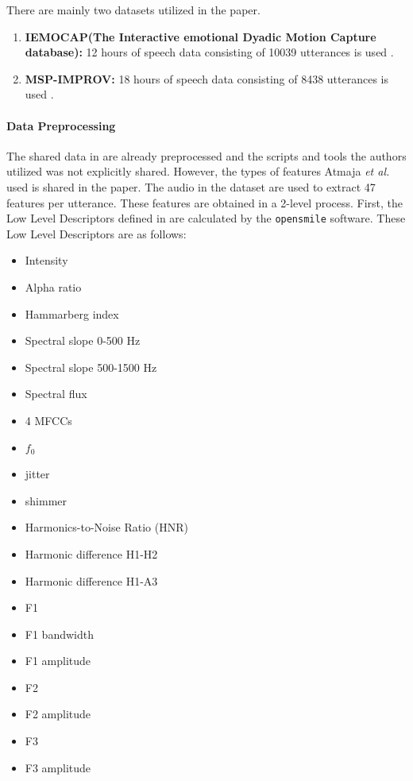 \documentclass[a4paper,11pt]{article}
\begin{document}
There are mainly two datasets utilized in the paper. 
\begin{enumerate}
    \item \textbf{IEMOCAP(The Interactive emotional Dyadic Motion Capture database):} 12 hours of speech data consisting of 10039 utterances  is used \cite{busso2008iemocap}.
    \item \textbf{MSP-IMPROV:} 18 hours of speech data consisting of 8438 utterances is used \cite{busso2016msp}.
\end{enumerate}

\paragraph{Data Preprocessing} \label{subsec:datapreprocess}

The shared data in \cite{atmaja2020deep} are already preprocessed and the scripts and tools the authors utilized was not explicitly shared. However, the types of features Atmaja \textit{et al.} used is shared in the paper.  
The audio in the dataset are used to extract 47 features per utterance.
These features are obtained in a 2-level process. First, the Low Level Descriptors defined in \cite{eyben2010opensmile} are calculated by the \texttt{opensmile} software. These Low Level Descriptors are as follows: 
\begin{multicols}{3}
\begin{itemize}
    \item Intensity
    \item Alpha ratio
    \item Hammarberg index
    \item Spectral slope 0-500 Hz
    \item Spectral slope 500-1500 Hz
    \item Spectral flux
    \item 4 MFCCs
    \item $f_0$
    \item jitter
    \item shimmer
    \item Harmonics-to-Noise Ratio (HNR)
    \item Harmonic difference H1-H2
    \item Harmonic difference H1-A3
    \item F1
    \item F1 bandwidth
    \item F1 amplitude
    \item F2
    \item F2 amplitude
    \item F3 
    \item F3 amplitude
\end{itemize}
\end{multicols}
\end{document}
